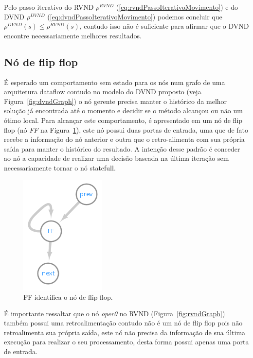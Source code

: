 Pelo passo iterativo do RVND $\rho^{RVND}$ (\ref{eq:rvndPassoIterativoMovimento}) e do DVND $\rho^{DVND}$ (\ref{eq:dvndPassoIterativoMovimento}) podemos concluir que $\rho^{DVND}(s) \le \rho^{RVND}(s)$, contudo isso não é suficiente para afirmar que o DVND encontre necessariamente melhores resultados.%

\subsection{Nó de flip flop}\label{subsec:flipFlop}

É esperado um comportamento sem estado para os nós num grafo de uma arquitetura dataflow contudo no modelo do DVND proposto (veja Figura~\ref{fig:dvndGraph}) o nó gerente precisa manter o histórico da melhor solução já encontrada até o momento e decidir se o método alcançou ou não um ótimo local. Para alcançar este comportamento, é apresentado em \cite{endm2018:araujo} um nó de flip flop \label{text:flipFlop} (nó \textit{FF} na Figura~\ref{fig:flipFlop}), este nó possui duas portas de entrada, uma que de fato recebe a informação do nó anterior e outra que o retro-alimenta com sua própria saída para manter o histórico do resultado. A intenção desse padrão é conceder ao nó a capacidade de realizar uma decisão baseada na última iteração sem necessariamente tornar o nó statefull.

\begin{figure}[htbp]
    \centerline{\includegraphics[scale=1.0]{figuras/dataflow/Flip_flop.png}}
    \caption{FF identifica o nó de flip flop.}
    \label{fig:flipFlop}
\end{figure}

É importante ressaltar que o nó \textit{oper0} no RVND (Figura~\ref{fig:rvndGraph}) também possui uma retroalimentação contudo não é um nó de flip flop pois não retroalimenta sua própria saída, este nó não precisa da informação de sua última execução para realizar o seu processamento, desta forma possui apenas uma porta de entrada.

